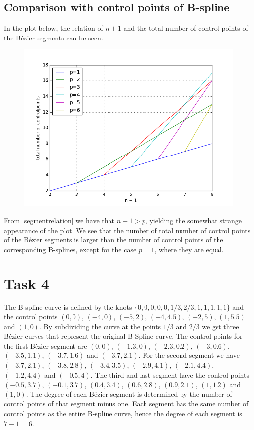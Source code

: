 \documentclass[]{article}
\begin{document}
\subsection*{Comparison with control points of B-spline}
In the plot below, the relation of $n+1$ and the total number of control points of the B\'{e}zier segments can be seen. 
\begin{figure}[h!]
	\includegraphics[scale=0.5]{segmentrelation}
\end{figure}
From \eqref{segmentrelation} we have that $n+1>p$, yielding the somewhat strange appearance of the plot. We see that the number of total number of control points of the B\'{e}zier segments is larger than the number of control points of the corresponding B-splines, except for the case $p=1$, where they are equal.

\newpage
\section*{Task 4}
The B-spline curve is defined by the knots $\{0,0,0,0,0,1/3,2/3,1,1,1,1,1\}$ and the control points $(0,0)$, $(-4,0)$, $(-5,2)$, $(-4,4.5)$, $(-2,5)$, $(1,5.5)$ and $(1,0)$. By subdividing the curve at the points $1/3$ and $2/3$ we get three B\'{e}zier curves that represent the original B-Spline curve. The control points for the first B\'{e}zier segment are $(0,0)$, $(-1.3,0)$, $(-2.3,0.2)$, $(-3,0.6)$, $(-3.5,1.1)$, $(-3.7,1.6)$ and $(-3.7,2.1)$. For the second segment we have $(-3.7,2.1)$, $(-3.8,2.8)$, $(-3.4,3.5)$, $(-2.9,4.1)$, $(-2.1,4.4)$, $(-1.2,4.4)$ and $(-0.5,4)$. The third and last segment have the control points $(-0.5,3.7)$, $(-0.1,3.7)$, $(0.4,3.4)$, $(0.6,2.8)$, $(0.9,2.1)$, $(1,1.2)$ and $(1,0)$. The degree of each B\'{e}zier segment is determined by the number of control points of that segment minus one. Each segment has the same number of control points as the entire B-spline curve, hence the degree of each segment is $7-1=6$.
\end{document}
